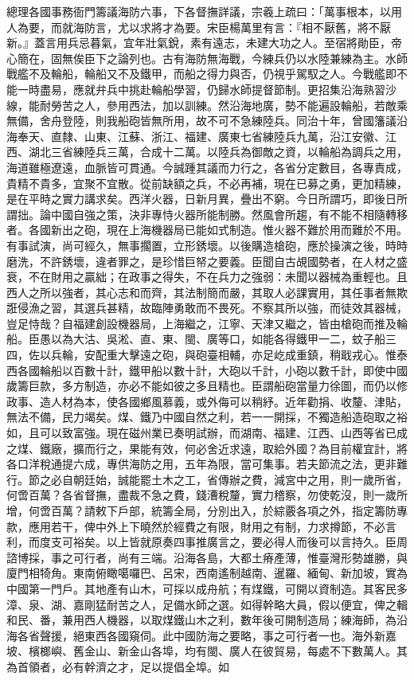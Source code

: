 \begin{pinyinscope}
總理各國事務衙門籌議海防六事，下各督撫詳議，宗羲上疏曰：「萬事根本，以用人為要，而就海防言，尤以求將才為要。宋臣楊萬里有言：『相不厭舊，將不厭新。』蓋言用兵忌暮氣，宜年壯氣銳，素有遠志，未建大功之人。至宿將勛臣，帝心簡在，固無俟臣下之論列也。古有海防無海戰，今練兵仍以水陸兼練為主。水師戰艦不及輪船，輪船又不及鐵甲，而船之得力與否，仍視乎駕馭之人。今戰艦即不能一時盡易，應就弁兵中挑赴輪船學習，仍歸水師提督節制。更招集沿海熟習沙線，能耐勞苦之人，參用西法，加以訓練。然沿海地廣，勢不能遍設輪船，若敵乘無備，舍舟登陸，則我船砲皆無所用，故不可不急練陸兵。同治十年，曾國籓議沿海奉天、直隸、山東、江蘇、浙江、福建、廣東七省練陸兵九萬，沿江安徽、江西、湖北三省練陸兵三萬，合成十二萬。以陸兵為御敵之資，以輪船為調兵之用，海道雖極遼遠，血脈皆可貫通。今誠踵其議而力行之，各省分定數目，各專責成，貴精不貴多，宜聚不宜散。從前缺額之兵，不必再補，現在已募之勇，更加精練，是在平時之實力講求矣。西洋火器，日新月異，疊出不窮。今日所謂巧，即後日所謂拙。論中國自強之策，決非專恃火器所能制勝。然風會所趨，有不能不相隨轉移者。各國新出之砲，現在上海機器局已能如式制造。惟火器不難於用而難於不用。有事試演，尚可經久，無事擱置，立形銹壞。以後購造槍砲，應於操演之後，時時磨洗，不許銹壞，違者罪之，是珍惜巨帑之要義。臣聞自古覘國勢者，在人材之盛衰，不在財用之贏絀；在政事之得失，不在兵力之強弱：未聞以器械為重輕也。且西人之所以強者，其心志和而齊，其法制簡而嚴，其取人必課實用，其任事者無欺誑侵漁之習，其選兵甚精，故臨陣勇敢而不畏死。不察其所以強，而徒效其器械，豈足恃哉？自福建創設機器局，上海繼之，江寧、天津又繼之，皆由槍砲而推及輪船。臣愚以為大沽、吳淞、直、東、閩、廣等口，如能各得鐵甲一二，蚊子船三四，佐以兵輪，安配重大擊遠之砲，與砲臺相輔，亦足屹成重鎮，稍戢戎心。惟泰西各國輪船以百數十計，鐵甲船以數十計，大砲以千計，小砲以數千計，即使中國歲籌巨款，多方制造，亦必不能如彼之多且精也。臣謂船砲當量力徐圖，而仍以修政事、造人材為本，使各國鄉風慕義，或外侮可以稍紓。近年勸捐、收釐、津貼，無法不備，民力竭矣。煤、鐵乃中國自然之利，若一一開採，不獨造船造砲取之裕如，且可以致富強。現在磁州業已奏明試辦，而湖南、福建、江西、山西等省已成之煤、鐵廠，擴而行之，果能有效，何必舍近求遠，取給外國？為目前權宜計，將各口洋稅通提六成，專供海防之用，五年為限，當可集事。若夫節流之法，更非難行。節之必自朝廷始，誠能罷土木之工，省傳辦之費，減宮中之用，則一歲所省，何啻百萬？各省督撫，盡裁不急之費，錢漕稅釐，實力稽察，勿使乾沒，則一歲所增，何啻百萬？請敕下戶部，統籌全局，分別出入，於綜覈各項之外，指定籌防專款，應用若干，俾中外上下曉然於經費之有限，財用之有制，力求撙節，不必言利，而度支可裕矣。以上皆就原奏四事推廣言之，要必得人而後可以言持久。臣周諮博採，事之可行者，尚有三端。沿海各島，大都土瘠產薄，惟臺灣形勢雄勝，與廈門相犄角。東南俯瞰噶囉巴、呂宋，西南遙制越南、暹羅、緬甸、新加坡，實為中國第一門戶。其地產有山木，可採以成舟航；有煤鐵，可開以資制造。其客民多漳、泉、湖、嘉剛猛耐苦之人，足備水師之選。如得幹略大員，假以便宜，俾之輯和民、番，兼用西人機器，以取煤鐵山木之利，數年後可開制造局；練海師，為沿海各省聲援，絕東西各國窺伺。此中國防海之要略，事之可行者一也。海外新嘉坡、檳榔嶼、舊金山、新金山各埠，均有閩、廣人在彼貿易，每處不下數萬人。其為首領者，必有幹濟之才，足以提倡全埠。如
\end{pinyinscope}
